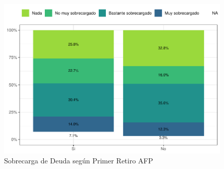 \documentclass[
  12pt,
]{book}
\begin{document}
\begin{figure}

{\centering \includegraphics{reporte-elsoc_files/figure-latex/endeud-2retiro-1} 

}

\caption{Sobrecarga de Deuda según Primer Retiro AFP}\label{fig:endeud-2retiro}
\end{figure}
\end{document}

